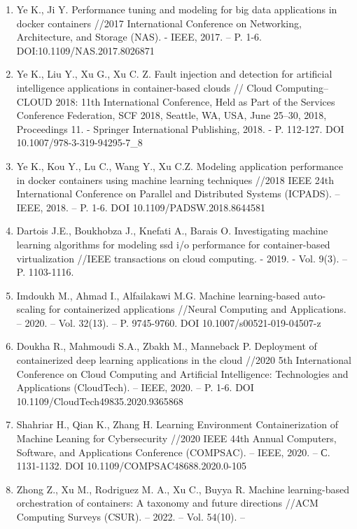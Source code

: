 \begin{enumerate}
\def\labelenumi{\arabic{enumi}.}
\item
  Ye K., Ji Y. Performance tuning and modeling for big data applications
  in docker containers //2017 International Conference on Networking,
  Architecture, and Storage (NAS). - IEEE, 2017. -- P. 1-6.
  DOI:10.1109/NAS.2017.8026871
\item
  Ye K., Liu Y., Xu G., Xu C. Z. Fault injection and detection for
  artificial intelligence applications in container-based clouds //
  Cloud Computing--CLOUD 2018: 11th International Conference, Held as
  Part of the Services Conference Federation, SCF 2018, Seattle, WA,
  USA, June 25--30, 2018, Proceedings 11. - Springer International
  Publishing, 2018. - P. 112-127. DOI 10.1007/978-3-319-94295-7\_8
\item
  Ye K., Kou Y., Lu C., Wang Y., Xu C.Z. Modeling application
  performance in docker containers using machine learning techniques
  //2018 IEEE 24th International Conference on Parallel and Distributed
  Systems (ICPADS). -- IEEE, 2018. -- P. 1-6. DOI
  10.1109/PADSW.2018.8644581
\item
  Dartois J.E., Boukhobza J., Knefati A., Barais O. Investigating
  machine learning algorithms for modeling ssd i/o performance for
  container-based virtualization //IEEE transactions on cloud computing.
  - 2019. - Vol. 9(3). -- P. 1103-1116.
\item
  Imdoukh M., Ahmad I., Alfailakawi M.G. Machine learning-based
  auto-scaling for containerized applications //Neural Computing and
  Applications. -- 2020. -- Vol. 32(13). -- P. 9745-9760. DOI
  10.1007/s00521-019-04507-z
\item
  Doukha R., Mahmoudi S.A., Zbakh M., Manneback P. Deployment of
  containerized deep learning applications in the cloud //2020 5th
  International Conference on Cloud Computing and Artificial
  Intelligence: Technologies and Applications (CloudTech). -- IEEE,
  2020. -- P. 1-6. DOI 10.1109/CloudTech49835.2020.9365868
\item
  Shahriar H., Qian K., Zhang H. Learning Environment Containerization
  of Machine Leaning for Cybersecurity //2020 IEEE 44th Annual
  Computers, Software, and Applications Conference (COMPSAC). -- IEEE,
  2020. -- С. 1131-1132. DOI 10.1109/COMPSAC48688.2020.0-105
\item
  Zhong Z., Xu M., Rodriguez M. A., Xu C., Buyya R. Machine
  learning-based orchestration of containers: A taxonomy and future
  directions //ACM Computing Surveys (CSUR). -- 2022. -- Vol. 54(10). --

\end{enumerate}
